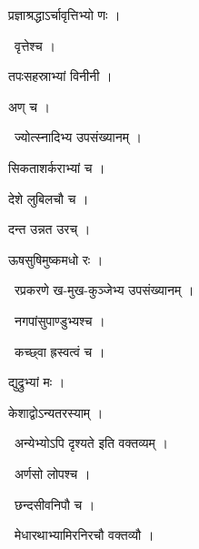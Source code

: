 \documentclass[10pt, openany, oneside]{book}
\begin{document}
\noindent प्रज्ञाश्रद्धाऽर्चावृत्तिभ्यो णः ।

\par\noindent\hspace{1.5em}{\vps वा॰}~{\qt वृत्तेश्च ।}

\noindent तपःसहस्राभ्यां विनीनी ।

\noindent अण् च ।

\par\noindent\hspace{1.5em}{\vps वा॰}~{\qt ज्योत्स्नादिभ्य उपसंख्यानम् ।}

\noindent सिकताशर्कराभ्यां च ।

\noindent देशे लुबिलचौ च ।

\noindent दन्त उन्नत उरच् ।

\noindent ऊषसुषिमुष्कमधो रः ।

\par\noindent\hspace{1.5em}{\vps वा॰}~{\qt रप्रकरणे ख-मुख-कुञ्जेभ्य उपसंख्यानम् ।}

\par\noindent\hspace{1.5em}{\vps वा॰}~{\qt नगपांसुपाण्डुभ्यश्च ।}

\par\noindent\hspace{1.5em}{\vps वा॰}~{\qt कच्छ्वा ह्रस्वत्वं च ।}

\noindent द्युद्रुभ्यां मः ।

\noindent केशाद्वोऽन्यतरस्याम् ।

\par\noindent\hspace{1.5em}{\vps वा॰}~{\qt अन्येभ्योऽपि दृश्यते इति वक्तव्यम् ।}

\par\noindent\hspace{1.5em}{\vps वा॰}~{\qt अर्णसो लोपश्च ।}

\par\noindent\hspace{1.5em}{\vps वा॰}~{\qt छन्दसीवनिपौ च ।}

\par\noindent\hspace{1.5em}{\vps वा॰}~{\qt मेधारथाभ्यामिरनिरचौ वक्तव्यौ ।}
\end{document}
